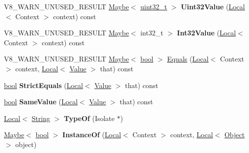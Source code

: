 \begin{DoxyCompactItemize}
V8\+\_\+\+W\+A\+R\+N\+\_\+\+U\+N\+U\+S\+E\+D\+\_\+\+R\+E\+S\+U\+LT \mbox{\hyperlink{classv8_1_1Maybe}{Maybe}}$<$ \mbox{\hyperlink{classuint32__t}{uint32\+\_\+t}} $>$ {\bfseries Uint32\+Value} (\mbox{\hyperlink{classv8_1_1Local}{Local}}$<$ Context $>$ context) const
\item 
\mbox{\label{classv8_1_1Value_a09fc57cf3502fc78eae6e3e9034fca65}} 
V8\+\_\+\+W\+A\+R\+N\+\_\+\+U\+N\+U\+S\+E\+D\+\_\+\+R\+E\+S\+U\+LT \mbox{\hyperlink{classv8_1_1Maybe}{Maybe}}$<$ int32\+\_\+t $>$ {\bfseries Int32\+Value} (\mbox{\hyperlink{classv8_1_1Local}{Local}}$<$ Context $>$ context) const
\item 
V8\+\_\+\+W\+A\+R\+N\+\_\+\+U\+N\+U\+S\+E\+D\+\_\+\+R\+E\+S\+U\+LT \mbox{\hyperlink{classv8_1_1Maybe}{Maybe}}$<$ \mbox{\hyperlink{classbool}{bool}} $>$ \mbox{\hyperlink{classv8_1_1Value_aaf9e18e3d2ca581d89deec43ec852f46}{Equals}} (\mbox{\hyperlink{classv8_1_1Local}{Local}}$<$ Context $>$ context, \mbox{\hyperlink{classv8_1_1Local}{Local}}$<$ \mbox{\hyperlink{classv8_1_1Value}{Value}} $>$ that) const
\item 
\mbox{\label{classv8_1_1Value_aca359114a4beedaf2858254013d0279e}} 
\mbox{\hyperlink{classbool}{bool}} {\bfseries Strict\+Equals} (\mbox{\hyperlink{classv8_1_1Local}{Local}}$<$ \mbox{\hyperlink{classv8_1_1Value}{Value}} $>$ that) const
\item 
\mbox{\label{classv8_1_1Value_a7c90dc5947b8b99b9089a020fff6d86d}} 
\mbox{\hyperlink{classbool}{bool}} {\bfseries Same\+Value} (\mbox{\hyperlink{classv8_1_1Local}{Local}}$<$ \mbox{\hyperlink{classv8_1_1Value}{Value}} $>$ that) const
\item 
\mbox{\label{classv8_1_1Value_a1f6e02579b0ddd7d223dd37bfea728d6}} 
\mbox{\hyperlink{classv8_1_1Local}{Local}}$<$ \mbox{\hyperlink{classv8_1_1String}{String}} $>$ {\bfseries Type\+Of} (Isolate $\ast$)
\item 
\mbox{\label{classv8_1_1Value_ada7a6d4af21b10def0fc940acd812558}} 
\mbox{\hyperlink{classv8_1_1Maybe}{Maybe}}$<$ \mbox{\hyperlink{classbool}{bool}} $>$ {\bfseries Instance\+Of} (\mbox{\hyperlink{classv8_1_1Local}{Local}}$<$ Context $>$ context, \mbox{\hyperlink{classv8_1_1Local}{Local}}$<$ \mbox{\hyperlink{classv8_1_1Object}{Object}} $>$ object)
\end{DoxyCompactItemize}
